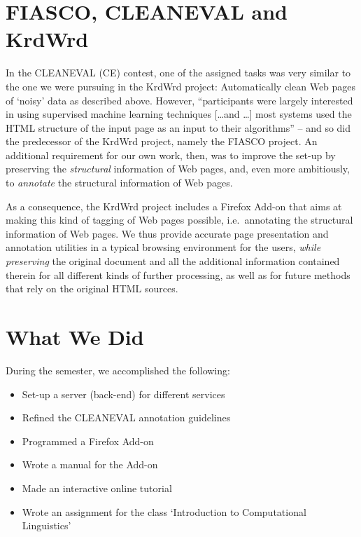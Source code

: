 \documentclass[12pt,a4paper]{article}
\begin{document}
\section{FIASCO, CLEANEVAL and KrdWrd}

In the CLEANEVAL (CE) contest, one of the assigned tasks was very similar to the one we were pursuing in the KrdWrd project: 
Automatically clean Web pages of `noisy' data as described above. However, ``participants were largely interested in using supervised machine learning techniques [\ldots and \ldots] most systems used the HTML structure of the input page as an input to their algorithms'' \cite{BaroniChantreeKilgarriffSharoff2008} -- and so did the predecessor of the KrdWrd project, namely the FIASCO project\cite{FIASCO2007}. 
An additional requirement for our own work, then, was to improve the set-up by preserving the \textit{structural} information of Web pages, and, even more ambitiously, to \textit{annotate} the structural information of Web pages.

As a consequence, the KrdWrd project includes a Firefox Add-on that aims at making this kind of tagging of Web pages possible, i.e.~annotating the structural information of Web pages. 
We thus provide accurate page presentation and annotation utilities in a typical browsing environment for the users, \textit{while preserving} the original document and all the additional information contained therein for all different kinds of further processing, as well as for future methods that rely on the original HTML sources.


\section{What We Did}

During the semester, we accomplished the following:

\begin{itemize}
	\item Set-up a server (back-end) for different services
	\item Refined the CLEANEVAL annotation guidelines
	\item Programmed a Firefox Add-on
	\item Wrote a manual for the Add-on
	\item Made an interactive online tutorial
	\item Wrote an assignment for the class `Introduction to Computational Linguistics'
\end{itemize}
\end{document}

